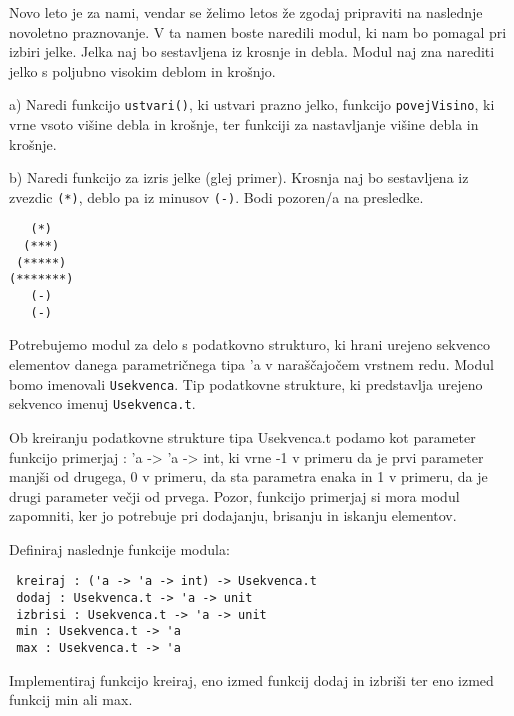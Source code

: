\begin{ex}
Novo leto je za nami, vendar se \v zelimo letos \v ze zgodaj pripraviti na
naslednje novoletno praznovanje. V ta namen boste naredili modul, ki
nam bo pomagal pri izbiri jelke. Jelka naj bo sestavljena iz krosnje
in debla. Modul naj zna narediti jelko s poljubno visokim deblom in
kro\v snjo.

a) Naredi funkcijo \lstinline{ustvari()}, ki ustvari prazno jelko, funkcijo
\lstinline{povejVisino}, ki vrne vsoto vi\v sine debla in kro\v snje, ter funkciji za
nastavljanje vi\v sine debla in kro\v snje.

b) Naredi funkcijo za izris jelke (glej primer). Krosnja naj bo
sestavljena iz zvezdic \lstinline{(*)}, deblo pa iz minusov \lstinline{(-)}. Bodi pozoren/a
na presledke.
\begin{lstlisting}
   (*)
  (***)
 (*****)
(*******)
   (-)
   (-)
\end{lstlisting}
\end{ex}
\begin{ex}
Potrebujemo modul za delo s podatkovno strukturo, ki hrani urejeno sekvenco elementov danega parametri\v cnega tipa 'a v nara\v s\v cajo\v cem vrstnem redu. Modul bomo imenovali \lstinline{Usekvenca}. Tip podatkovne strukture, ki predstavlja urejeno sekvenco imenuj \lstinline{Usekvenca.t}.

Ob kreiranju podatkovne strukture tipa Usekvenca.t podamo kot parameter funkcijo primerjaj : 'a -> 'a -> int, ki vrne -1 v primeru da je prvi parameter manj\v si od drugega, 0 v primeru, da sta parametra enaka in 1 v primeru, da je drugi parameter ve\v cji od prvega. Pozor, funkcijo primerjaj si mora modul zapomniti, ker jo potrebuje pri
dodajanju, brisanju in iskanju elementov.

Definiraj naslednje funkcije modula: 
\begin{lstlisting}
 kreiraj : ('a -> 'a -> int) -> Usekvenca.t 
 dodaj : Usekvenca.t -> 'a -> unit 
 izbrisi : Usekvenca.t -> 'a -> unit   
 min : Usekvenca.t -> 'a 
 max : Usekvenca.t -> 'a 
\end{lstlisting}

Implementiraj funkcijo kreiraj, eno izmed funkcij dodaj in izbri\v si ter
eno izmed funkcij min ali max.



\end{ex}
